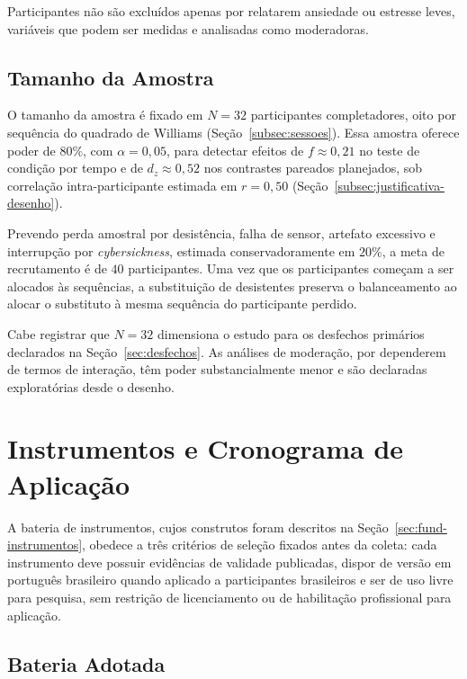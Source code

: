 Participantes não são excluídos apenas por relatarem ansiedade ou estresse leves, variáveis que podem ser medidas e analisadas como moderadoras.

\subsection{Tamanho da Amostra}\label{subsec:amostra}

O tamanho da amostra é fixado em $N = 32$ participantes completadores, oito por sequência do quadrado de Williams (Seção~\ref{subsec:sessoes}). Essa amostra oferece poder de $80\%$, com $\alpha = 0{,}05$, para detectar efeitos de $f \approx 0{,}21$ no teste de condição por tempo e de $d_z \approx 0{,}52$ nos contrastes pareados planejados, sob correlação intra-participante estimada em $r = 0{,}50$ (Seção~\ref{subsec:justificativa-desenho}).

Prevendo perda amostral por desistência, falha de sensor, artefato excessivo e interrupção por \textit{cybersickness}, estimada conservadoramente em $20\%$, a meta de recrutamento é de $40$ participantes. Uma vez que os participantes começam a ser alocados às sequências, a substituição de desistentes preserva o balanceamento ao alocar o substituto à mesma sequência do participante perdido.

Cabe registrar que $N = 32$ dimensiona o estudo para os desfechos primários declarados na Seção~\ref{sec:desfechos}. As análises de moderação, por dependerem de termos de interação, têm poder substancialmente menor e são declaradas exploratórias desde o desenho.

\section{Instrumentos e Cronograma de Aplicação}\label{sec:instrumentos-crono}

A bateria de instrumentos, cujos construtos foram descritos na Seção~\ref{sec:fund-instrumentos}, obedece a três critérios de seleção fixados antes da coleta: cada instrumento deve possuir evidências de validade publicadas, dispor de versão em português brasileiro quando aplicado a participantes brasileiros e ser de uso livre para pesquisa, sem restrição de licenciamento ou de habilitação profissional para aplicação.

\subsection{Bateria Adotada}\label{subsec:bateria}


